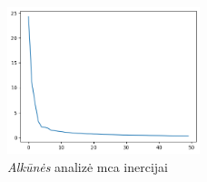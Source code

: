 \begin{figure}[h]
    \centering
    \includegraphics[width=0.5\textwidth]{images/inertia_50.png}
    \caption{\textit{Alkūnės} analizė \gls{mca} inercijai}
    \label{fig:inertia}
\end{figure}

